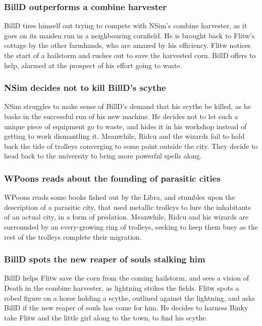 \subsubsection{\Gls{BillD} outperforms a combine harvester}
\Gls{BillD} tires himself out trying to compete with \Gls{NSim}'s combine harvester, as it goes on
its maiden run in a neighbouring cornfield. He is brought back to \Gls{Flitw}'s cottage by the
other farmhands, who are amazed by his efficiency. \Gls{Flitw} notices the start of a hailstorm
and rushes out to save the harvested corn. \Gls{BillD} offers to help, alarmed at the prospect of
his effort going to waste.

\subsubsection{\Gls{NSim} decides not to kill \Gls{BillD}'s scythe}
\Gls{NSim} struggles to make sense of \Gls{BillD}'s demand that his scythe be killed, as he basks in
the successful run of his new machine. He decides not to let such a unique piece of equipment go to
waste, and hides it in his workshop instead of getting to work dismantling it. Meanwhile,
\Gls{Ridcu} and the wizards fail to hold back the tide of trolleys converging to some point outside
the city. They decide to head back to the university to bring more powerful spells along.

\subsubsection{\Gls{WPoons} reads about the founding of parasitic cities}
\Gls{WPoons} reads some books fished out by the \Gls{Libra}, and stumbles upon the description of a
parasitic city, that used metallic trolleys to lure the inhabitants of an actual city, in a form
of predation. Meanwhile, \Gls{Ridcu} and his wizards are surrounded by an every-growing ring of
trolleys, seeking to keep them busy as the rest of the trolleys complete their migration.

\subsubsection{\Gls{BillD} spots the new reaper of souls stalking him}
\Gls{BillD} helps \Gls{Flitw} save the corn from the coming hailstorm, and sees a vision of
\Gls{Death} in the combine harvester, as lightning strikes the fields. \Gls{Flitw} spots a robed
figure on a horse holding a scythe, outlined against the lightning, and asks \Gls{BillD} if the new
reaper of souls has come for him. He decides to harness \Gls{Binky}  take \Gls{Flitw} and the little
girl along to the town, to find his scythe.

